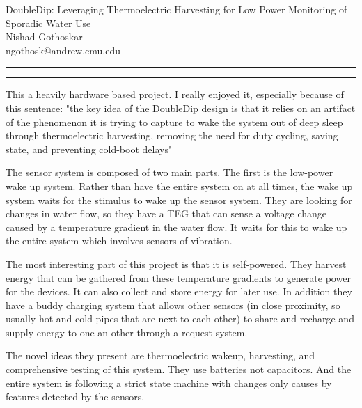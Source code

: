 \documentclass[11pt]{article}
\newcommand{\question}[2] {\vspace{.25in} \hrule\vspace{0.5em}
	\noindent{\bf #1: #2} \vspace{0.5em}
	\hrule \vspace{.10in}}
\newcommand{\myname}{Nishad Gothoskar}
\newcommand{\myandrew}{ngothosk}
\begin{document}
	
	\medskip                        %
	
	\thispagestyle{plain}
	\begin{center}                  %
		{\Large DoubleDip: Leveraging Thermoelectric Harvesting for Low Power Monitoring of Sporadic Water Use
} \\
		\myname \\
		\myandrew @andrew.cmu.edu\\
	\end{center}
	
	\question{1}{Summary}
	\quad This a heavily hardware based project. I really enjoyed it, especially because of this sentence: "the key idea of the DoubleDip design is that it relies on an artifact of the phenomenon it is trying to capture to wake the system out of deep sleep through thermoelectric harvesting, removing the need for duty cycling, saving state, and preventing cold-boot delays"
	
	\quad The sensor system is composed of two main parts. The first is the low-power wake up system. Rather than have the entire system on at all times, the wake up system waits for the stimulus to wake up the sensor system. They are looking for changes in water flow, so they have a TEG that can sense a voltage change caused by a temperature gradient in the water flow. It waits for this to wake up the entire system which involves sensors of vibration.
	
	\quad The most interesting  part of this project is that it is self-powered. They harvest energy that can be gathered from these temperature gradients to generate power for the devices. It can also collect and store energy for later use. In addition they have a buddy charging system that allows other sensors (in close proximity, so usually hot and cold pipes that are next to each other) to share and recharge and supply energy to one an other through a request system.
	
	\quad The novel ideas they present are thermoelectric wakeup, harvesting, and comprehensive testing of this system. They use batteries not capacitors. And the entire system is following a strict state machine with changes only causes by features detected by the sensors.
	
\end{document}

